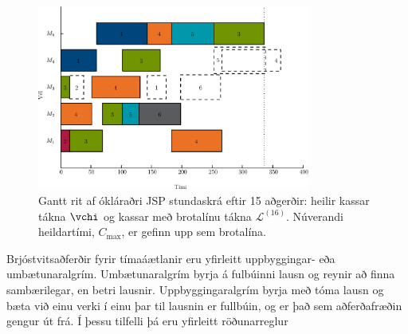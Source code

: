 \documentclass[]{article}
\begin{document}
\begin{figure}[p]\centering
    \includegraphics[width=0.8\textwidth]{figures/jssp_example.eps}
    \caption[Gantt rit af ókláraðri JSP stundaskrá]{Gantt rit af ókláraðri JSP 
    stundaskrá eftir 15 aðgerðir: heilir kassar tákna $\vchi$ og kassar með 
    brotalínu tákna $\mathcal{L}^{(16)}$. 
    Núverandi heildartími, $C_{\max}$, er gefinn upp sem brotalína.}
    \label{fig:jssp:example}
\end{figure}

Brjóstvitsaðferðir fyrir tímaáætlanir eru yfirleitt uppbyggingar- eða 
umbætunaralgrím.
Umbætunaralgrím byrja á fulbúinni lausn og reynir að finna sambærilegar, en 
betri lausnir. 
Uppbyggingaralgrím byrja með tóma lausn og bæta við einu verki í einu þar til 
lausnin er fullbúin, og er það sem aðferðafræðin gengur út frá. 
Í þessu tilfelli þá eru yfirleitt röðunarreglur 
\end{document}
